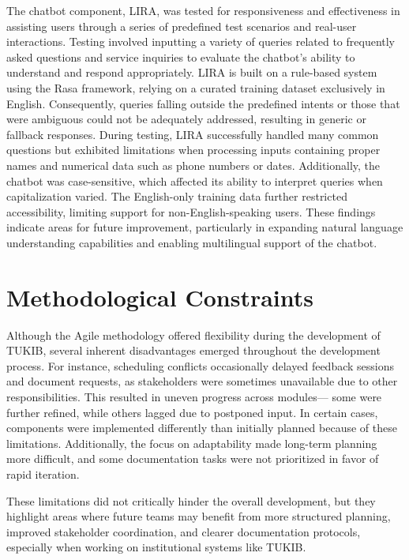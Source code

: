 The chatbot component, LIRA, was tested for responsiveness and effectiveness in assisting users through a series of predefined test scenarios and real-user interactions. Testing involved inputting a variety of queries related to frequently asked questions and service inquiries to evaluate the chatbot’s ability to understand and respond appropriately. LIRA is built on a rule-based system using the Rasa framework, relying on a curated training dataset exclusively in English. Consequently, queries falling outside the predefined intents or those that were ambiguous could not be adequately addressed, resulting in generic or fallback responses. During testing, LIRA successfully handled many common questions but exhibited limitations when processing inputs containing proper names and numerical data such as phone numbers or dates. Additionally, the chatbot was case-sensitive, which affected its ability to interpret queries when capitalization varied. The English-only training data further restricted accessibility, limiting support for non-English-speaking users. These findings indicate areas for future improvement, particularly in expanding natural language understanding capabilities and enabling multilingual support of the chatbot.

\section{Methodological Constraints}

Although the Agile methodology offered flexibility during the development of TUKIB, several inherent disadvantages emerged throughout the development process. For instance, scheduling conflicts occasionally delayed feedback sessions and document requests, as stakeholders were sometimes unavailable due to other responsibilities. This resulted in uneven progress across modules— some were further refined, while others lagged due to postponed input. In certain cases, components were implemented differently than initially planned because of these limitations. Additionally, the focus on adaptability made long-term planning more difficult, and some documentation tasks were not prioritized in favor of rapid iteration.

These limitations did not critically hinder the overall development, but they highlight areas where future teams may benefit from more structured planning, improved stakeholder coordination, and clearer documentation protocols, especially when working on institutional systems like TUKIB.

